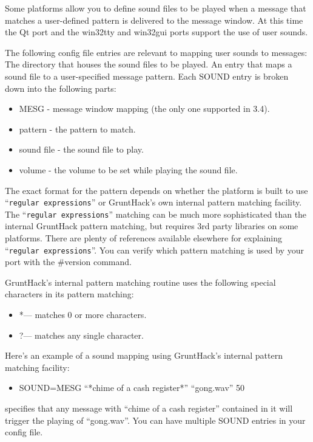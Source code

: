 Some platforms allow you to define sound files to be played when a message 
that matches a user-defined pattern is delivered to the message window.
At this time the Qt port and the win32tty and win32gui ports support the
use of user sounds.

The following config file entries are relevant to mapping user sounds
to messages:
The directory that houses the sound files to be played.
An entry that maps a sound file to a user-specified message pattern.
Each SOUND entry is broken down into the following parts:
\begin{itemize}
\item MESG       - message window mapping (the only one supported in 3.4).
\item pattern    - the pattern to match.
\item sound file - the sound file to play.
\item volume     - the volume to be set while playing the sound file.
\end{itemize}

The exact format for the pattern depends on whether the platform is
built to use ``{\tt regular expressions}'' or GruntHack's own internal pattern 
matching facility. The ``{\tt regular expressions}'' matching can be much more 
sophisticated than the internal GruntHack pattern matching, but requires 
3rd party libraries on some platforms.  There are plenty of references 
available elsewhere for explaining ``{\tt regular expressions}''. You can verify 
which pattern matching is used by your port with the \#version command.  

GruntHack's internal pattern matching routine uses the following
special characters in its pattern matching:
\begin{itemize}
\item  *--- matches 0 or more characters.
\item  ?--- matches any single character.
\end{itemize}

Here's an example of a sound mapping using GruntHack's internal
pattern matching facility:
\begin{itemize}
\item SOUND=MESG ``*chime of a cash register*'' ``gong.wav'' 50
\end{itemize}
specifies that any message with ``chime of a cash register'' contained
in it will trigger the playing of ``gong.wav''.  You can have multiple
SOUND entries in your config file.

